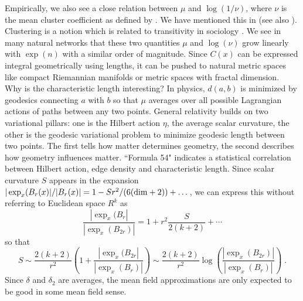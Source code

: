 \documentclass[12pt]{amsart}
\theoremstyle{definition}
\begin{document}
Empirically, we also see a close relation between $\mu$ and $\log(1/\nu)$, where $\nu$ is the mean 
cluster coefficient as defined by \cite{WattsStrogatz}. We have mentioned this in 
\cite{KnillMiniatures} (see also \cite{KnillAffine,KnillOrbital3}). Clustering is a notion 
which is related to transitivity in sociology \cite{WassermanFaust}. We see in many natural networks
that these two quantities $\mu$ and $\log(\nu)$ grow linearly with $\exp(n)$ with a similar 
order of magnitude. Since $C(x)$ can be expressed integral geometrically
using lengths, it can be pushed to natural metric spaces like compact Riemannian 
manifolds or metric spaces with fractal dimension. \\

Why is the characteristic length interesting? In physics, $d(a,b)$ is minimized by geodesics
connecting $a$ with $b$ so that $\mu$ averages over all possible Lagrangian actions of 
paths between any two points. General relativity builds on two variational pillars: one is 
the Hilbert action $\eta$, the average scalar curvature, the other is the 
geodesic variational problem to minimize geodesic length between two points. 
The first tells how matter determines geometry, the second 
describes how geometry influences matter. ``Formula 54" indicates a statistical correlation between
Hilbert action, edge density and characteristic length. Since scalar curvature $S$ appears in the expansion
$|\exp_x(B_r(x)|/|B_r(x)| = 1-S r^2/(6({\rm dim}+2)) + \dots$, we can express this without 
referring to Euclidean space $R^k$ as 
$$  \frac{|\exp_x(B_{r}|}{|\exp_x(B_{2r})|} = 1+r^2 \frac{S}{2(k+2)} +  \cdots $$ 
so that
$$ S \sim  \frac{2(k+2)}{r^2} ( 1+\frac{|\exp_x(B_{2r}|}{|\exp_x(B_{r})|}) 
     \sim  \frac{2(k+2)}{r^2} \log( \frac{|\exp_x(B_{2r})|}{|\exp_x(B_r)|} ) \; . $$
Since $\delta$ and $\delta_2$ are averages, the mean field approximations are 
only expected to be good in some mean field sense.  \\
\end{document}
